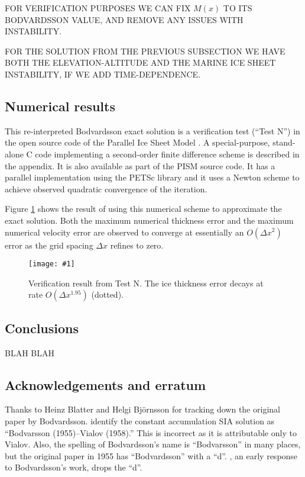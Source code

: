 \documentclass[twocolumn,letterpaper]{igs}
\newcommand{\onecol}[1]{\texttt{[image: \#1]}}
\begin{document}
FOR VERIFICATION PURPOSES WE CAN FIX $M(x)$ TO ITS BODVARDSSON VALUE, AND REMOVE ANY ISSUES WITH INSTABILITY.

FOR THE SOLUTION FROM THE PREVIOUS SUBSECTION WE HAVE BOTH THE ELEVATION-ALTITUDE AND THE MARINE ICE SHEET INSTABILITY, IF WE ADD TIME-DEPENDENCE.



\subsection*{Numerical results}

This re-interpreted Bodvardsson exact solution is a verification test (``Test N'') in the open source code of the Parallel Ice Sheet Model \citep[PISM; ][]{pism-user-manual}.  A special-purpose, stand-alone C code implementing a second-order finite difference scheme is described in the appendix.  It is also available as part of the PISM source code.  It has a parallel implementation using the PETSc \citep{petsc-user-ref} library and it uses a Newton scheme to achieve observed quadratic convergence of the iteration.

Figure \ref{fig:verifNresult} shows the result of using this numerical scheme to approximate the exact solution.  Both the maximum numerical thickness error and the maximum numerical velocity error are observed to converge at essentially an $O(\Delta x^2)$ error as the grid spacing $\Delta x$ refines to zero.  

\begin{figure}[ht]
\onecol{verifN}
\caption{Verification result from Test N.  The ice thickness error decays at rate $O(\Delta x^{1.95})$ (dotted).} \label{fig:verifNresult}
\end{figure}


\subsection*{Conclusions} BLAH BLAH

\subsection*{Acknowledgements and erratum}  Thanks to Heinz Blatter and Helgi Bj\"ornsson for tracking down the original paper by Bodvardsson.  \cite{BLKCB} identify the constant accumulation SIA solution as ``Bodvarsson (1955)--Vialov (1958).''  This is incorrect as it is attributable only to Vialov.  Also, the spelling of Bodvardsson's name is ``Bodvarsson'' in many places, but the original paper in 1955 has ``Bodvardsson'' with a ``d''.  \cite{Weertman61stability}, an early response to Bodvardsson's work, drops the ``d''.
\end{document}
